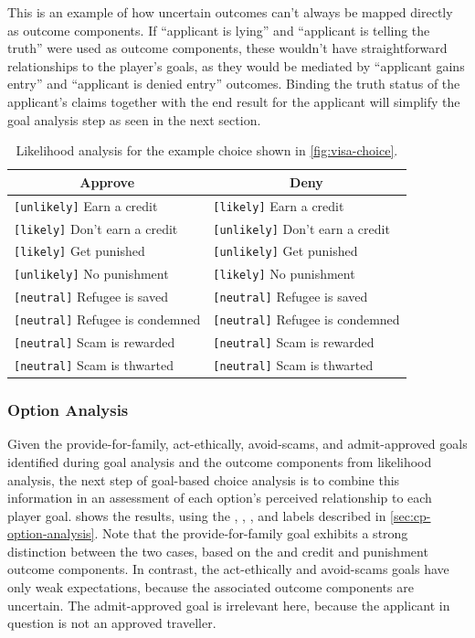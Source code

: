 This is an example of how uncertain outcomes can't always be mapped directly as outcome components.
%
If ``applicant is lying'' and ``applicant is telling the truth'' were used as outcome components, these wouldn't have straightforward relationships to the player's goals, as they would be mediated by ``applicant gains entry'' and ``applicant is denied entry'' outcomes.
%
Binding the truth status of the applicant's claims together with the end result for the applicant will simplify the goal analysis step as seen in the next section.

\begin{table}[t]
\centering
\begin{tabular}{l l}
  \toprule
  \multicolumn{1}{c}{\textbf{Approve}} & \multicolumn{1}{c}{\textbf{Deny}} \\
  \midrule
  \texttt{[unlikely]} Earn a credit & \texttt{[likely]} Earn a credit \\
  \texttt{[likely]} Don't earn a credit & \texttt{[unlikely]} Don't earn a credit \\
  \texttt{[likely]} Get punished & \texttt{[unlikely]} Get punished \\
  \texttt{[unlikely]} No punishment & \texttt{[likely]} No punishment \\
  \texttt{[neutral]} Refugee is saved & \texttt{[neutral]} Refugee is saved \\
  \texttt{[neutral]} Refugee is condemned & \texttt{[neutral]} Refugee is condemned \\
  \texttt{[neutral]} Scam is rewarded & \texttt{[neutral]} Scam is rewarded \\
  \texttt{[neutral]} Scam is thwarted & \texttt{[neutral]} Scam is thwarted \\
  \bottomrule
\end{tabular}
\caption[Example likelihood analysis]{Likelihood analysis for the example choice shown in \cref{fig:visa-choice}.}
\label{tab:ex-likelihoods}
\end{table}


\subsubsection{Option Analysis}

Given the provide-for-family, act-ethically, avoid-scams, and admit-approved goals identified during goal analysis and the outcome components from likelihood analysis, the next step of goal-based choice analysis is to combine this information in an assessment of each option's perceived relationship to each player goal.
%
 shows the results, using the , , , and  labels described in \cref{sec:cp-option-analysis}.
%
Note that the provide-for-family goal exhibits a strong distinction between the two cases, based on the  and  credit and punishment outcome components.
%
In contrast, the act-ethically and avoid-scams goals have only weak expectations, because the associated outcome components are uncertain.
%
The admit-approved goal is irrelevant here, because the applicant in question is not an approved traveller.



